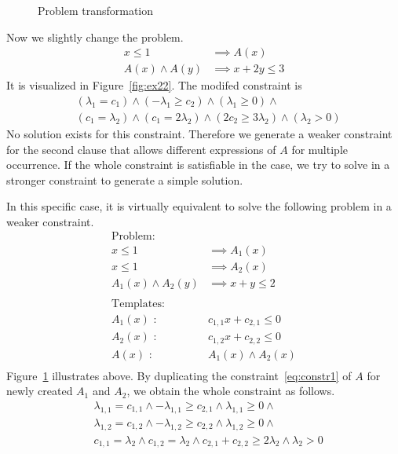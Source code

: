 \begin{figure}[htb]
\begin{minipage}[t]{.47\textwidth}
  \caption{Problem transformation}
  \label{fig:ex23}
  \end{minipage}
\end{figure}

Now we slightly change the problem.
\begin{align*}
x \leq 1 & \implies A(x) \\
A(x) \wedge A(y) & \implies x+2y \leq 3
\end{align*}
It is visualized in Figure~\ref{fig:ex22}.  The modifed constraint is
\begin{align*}
& (\lambda_1 = c_1) \wedge (- \lambda_1 \geq c_2) \wedge (\lambda_1 \geq 0) \wedge \\
& (c_1 = \lambda_2) \wedge (c_1 = 2\lambda_2) \wedge (2 c_2 \geq 3 \lambda_2) \wedge (\lambda_2 > 0)
\end{align*}
No solution exists for this constraint.  Therefore we generate a
weaker constraint for the second clause that allows different
expressions of $A$ for multiple occurrence.  If the whole constraint
is satisfiable in the case, we try to solve in a stronger constraint
to generate a simple solution.

In this specific case, it is virtually equivalent to solve the
following problem in a weaker constraint.
\begin{align*}
\text{Problem:} \\
x \leq 1 & \implies A_1(x) \\
x \leq 1 & \implies A_2(x) \\
A_1(x) \wedge A_2(y) & \implies x+y \leq 2 \\
\\
\text{Templates:} \\
A_1(x) \text{ : } & c_{1,1} x + c_{2,1} \leq 0 \\
A_2(x) \text{ : } & c_{1,2} x + c_{2,2} \leq 0 \\
A(x) \text{ : } & A_1(x) \wedge A_2(x) \\
\end{align*}
Figure~\ref{fig:ex23} illustrates above.  By duplicating the
constraint~\ref{eq:constr1} of $A$ for newly created $A_1$ and $A_2$,
we obtain the whole constraint as follows.
\begin{align*}
& \lambda_{1,1} = c_{1,1} \wedge - \lambda_{1,1} \geq c_{2,1} \wedge \lambda_{1,1} \geq 0 \wedge \\
& \lambda_{1,2} = c_{1,2} \wedge - \lambda_{1,2} \geq c_{2,2} \wedge \lambda_{1,2} \geq 0 \wedge \\
& c_{1,1} = \lambda_2 \wedge c_{1,2} = \lambda_2 \wedge c_{2,1} + c_{2,2} \geq 2 \lambda_2 \wedge \lambda_2 > 0
\end{align*}

